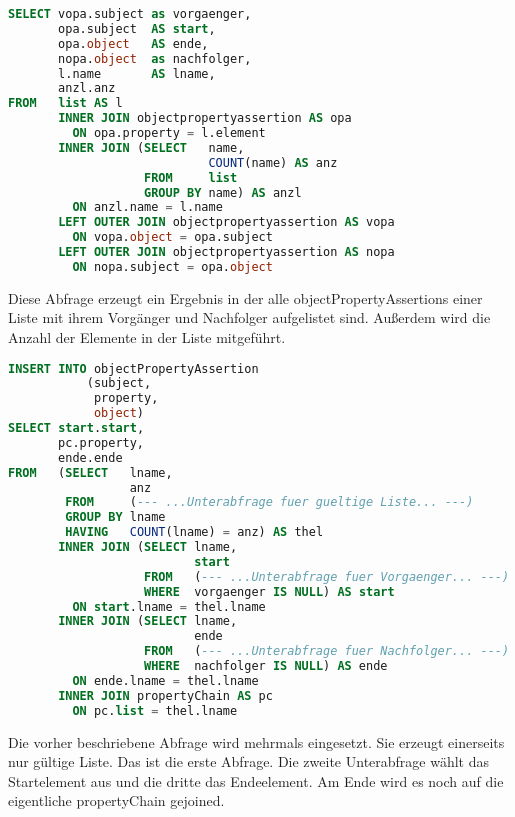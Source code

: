 \begin{lstlisting}[language=SQL]
SELECT vopa.subject as vorgaenger,
       opa.subject  AS start,
       opa.object   AS ende,
       nopa.object  as nachfolger,
       l.name       AS lname,
       anzl.anz
FROM   list AS l
       INNER JOIN objectpropertyassertion AS opa
         ON opa.property = l.element
       INNER JOIN (SELECT   name,
                            COUNT(name) AS anz
                   FROM     list
                   GROUP BY name) AS anzl
         ON anzl.name = l.name
       LEFT OUTER JOIN objectpropertyassertion AS vopa
         ON vopa.object = opa.subject
       LEFT OUTER JOIN objectpropertyassertion AS nopa
         ON nopa.subject = opa.object
\end{lstlisting}

Diese Abfrage erzeugt ein Ergebnis in der alle objectPropertyAssertions einer Liste mit ihrem Vorgänger und Nachfolger aufgelistet sind. Außerdem wird die Anzahl der Elemente in der Liste mitgeführt.

\begin{lstlisting}[language=SQL]
INSERT INTO objectPropertyAssertion
           (subject,
            property,
            object)
SELECT start.start,
       pc.property,
       ende.ende
FROM   (SELECT   lname,
                 anz
        FROM     (--- ...Unterabfrage fuer gueltige Liste... ---)
        GROUP BY lname
        HAVING   COUNT(lname) = anz) AS thel
       INNER JOIN (SELECT lname,
                          start
                   FROM   (--- ...Unterabfrage fuer Vorgaenger... ---)
                   WHERE  vorgaenger IS NULL) AS start
         ON start.lname = thel.lname
       INNER JOIN (SELECT lname,
                          ende
                   FROM   (--- ...Unterabfrage fuer Nachfolger... ---)
                   WHERE  nachfolger IS NULL) AS ende
         ON ende.lname = thel.lname
       INNER JOIN propertyChain AS pc
         ON pc.list = thel.lname
\end{lstlisting}

Die vorher beschriebene Abfrage wird mehrmals eingesetzt. Sie erzeugt einerseits nur gültige Liste. Das ist die erste Abfrage. Die zweite Unterabfrage wählt das Startelement aus und die dritte das Endeelement. Am Ende wird es noch auf die eigentliche propertyChain gejoined.


